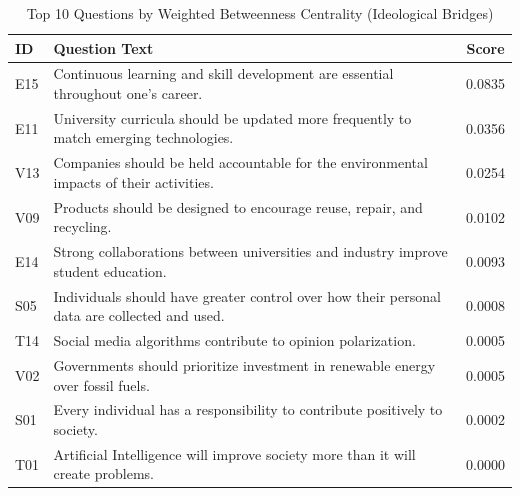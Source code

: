 \documentclass[11pt, a4paper]{article}
\begin{document}
\begin{table}[H]
\centering
\caption{Top 10 Questions by Weighted Betweenness Centrality (Ideological Bridges)}
\label{tab:betweenness}
\renewcommand{\arraystretch}{1.2}
\begin{tabular}{l p{10cm} c}
\toprule
\textbf{ID} & \textbf{Question Text} & \textbf{Score} \\
\midrule
E15 & Continuous learning and skill development are essential throughout one's career. & 0.0835 \\
E11 & University curricula should be updated more frequently to match emerging technologies. & 0.0356 \\
V13 & Companies should be held accountable for the environmental impacts of their activities. & 0.0254 \\
V09 & Products should be designed to encourage reuse, repair, and recycling. & 0.0102 \\
E14 & Strong collaborations between universities and industry improve student education. & 0.0093 \\
S05 & Individuals should have greater control over how their personal data are collected and used. & 0.0008 \\
T14 & Social media algorithms contribute to opinion polarization. & 0.0005 \\
V02 & Governments should prioritize investment in renewable energy over fossil fuels. & 0.0005 \\
S01 & Every individual has a responsibility to contribute positively to society. & 0.0002 \\
T01 & Artificial Intelligence will improve society more than it will create problems. & 0.0000 \\
\bottomrule
\end{tabular}
\end{table}
\end{document}
